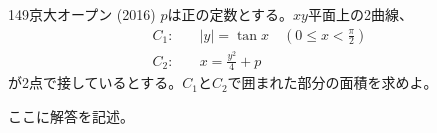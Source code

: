\begin{prob}{149}{\maru}{京大オープン (2016)}
 $p$は正の定数とする。$xy$平面上の2曲線、
 \begin{align*}
  C_1:\quad & |y|=\tan x \quad (0\le x < \frac{\pi}{2}) \\
  C_2:\quad & x=\frac{y^2}{4}+p
 \end{align*}
 が2点で接しているとする。$C_1$と$C_2$で囲まれた部分の面積を求めよ。
\end{prob}
ここに解答を記述。